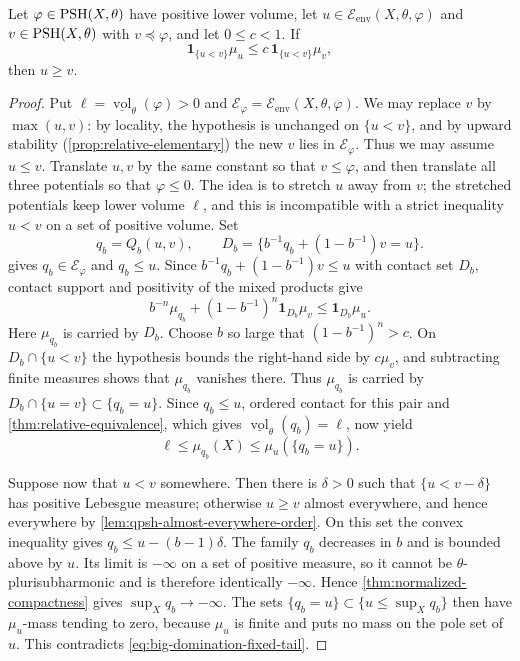 \begin{theorem}\label{thm:big-relative-domination}
Let $\varphi\in\mathrm{PSH}(X,\theta)$ have positive lower volume, let $u\in\mathcal E_{\mathrm{env}}(X,\theta,\varphi)$ and $v\in\mathrm{PSH}(X,\theta)$ with $v\preceq\varphi$, and let $0\leq c<1$. If
\[
 \mathbf1_{\{u<v\}}\mu_u\leq c\,\mathbf1_{\{u<v\}}\mu_v,
\]
then $u\geq v$.
\end{theorem}
\begin{proof}
Put $\ell=\underline{\operatorname{vol}}_\theta(\varphi)>0$ and $\mathcal E_\varphi=\mathcal E_{\mathrm{env}}(X,\theta,\varphi)$. We may replace $v$ by $\max(u,v)$: by locality, the hypothesis is unchanged on $\{u<v\}$, and by upward stability (\cref{prop:relative-elementary}) the new $v$ lies in $\mathcal E_\varphi$. Thus we may assume $u\leq v$. Translate $u,v$ by the same constant so that $v\leq\varphi$, and then translate all three potentials so that $\varphi\leq0$. The idea is to stretch $u$ away from $v$; the stretched potentials keep lower volume $\ell$, and this is incompatible with a strict inequality $u<v$ on a set of positive volume. Set
\[
 q_b=Q_b(u,v),\qquad
 D_b=\{b^{-1}q_b+(1-b^{-1})v=u\}.
\]
 gives $q_b\in\mathcal E_\varphi$ and $q_b\leq u$. Since $b^{-1}q_b+(1-b^{-1})v\leq u$ with contact set $D_b$, contact support and positivity of the mixed products give
\[
 b^{-n}\mu_{q_b}+(1-b^{-1})^n\mathbf1_{D_b}\mu_v
 \leq\mathbf1_{D_b}\mu_u.
\]
Here $\mu_{q_b}$ is carried by $D_b$. Choose $b$ so large that $(1-b^{-1})^n>c$. On $D_b\cap\{u<v\}$ the hypothesis bounds the right-hand side by $c\mu_v$, and subtracting finite measures shows that $\mu_{q_b}$ vanishes there. Thus $\mu_{q_b}$ is carried by $D_b\cap\{u=v\}\subset\{q_b=u\}$. Since $q_b\leq u$, ordered contact for this pair and \cref{thm:relative-equivalence}, which gives $\underline{\operatorname{vol}}_\theta(q_b)=\ell$, now yield
\begin{equation}\label{eq:big-domination-fixed-tail}
 \ell\leq\mu_{q_b}(X)\leq\mu_u(\{q_b=u\}).
\end{equation}

Suppose now that $u<v$ somewhere. Then there is $\delta>0$ such that $\{u<v-\delta\}$ has positive Lebesgue measure; otherwise $u\geq v$ almost everywhere, and hence everywhere by \cref{lem:qpsh-almost-everywhere-order}. On this set the convex inequality gives
$q_b\leq u-(b-1)\delta$. The family $q_b$ decreases in $b$ and is bounded above by $u$. Its limit is $-\infty$ on a set of positive measure, so it cannot be $\theta$-plurisubharmonic and is therefore identically $-\infty$. Hence \cref{thm:normalized-compactness} gives $\sup_Xq_b\to-\infty$. The sets $\{q_b=u\}\subset\{u\leq\sup_Xq_b\}$ then have $\mu_u$-mass tending to zero, because $\mu_u$ is finite and puts no mass on the pole set of $u$. This contradicts \eqref{eq:big-domination-fixed-tail}.
\end{proof}


